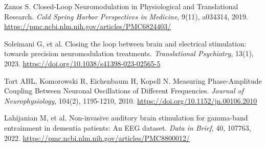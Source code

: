 \documentclass[11pt,letterpaper]{article}
\begin{document}
\begin{enumerate}[label={[\arabic*]}, leftmargin=2em, itemsep=2pt, parsep=0pt]
\item Zanos S. Closed-Loop Neuromodulation in Physiological and Translational Research. \textit{Cold Spring Harbor Perspectives in Medicine}, 9(11), a034314, 2019. \url{https://pmc.ncbi.nlm.nih.gov/articles/PMC6824403/}
\item Soleimani G, et al. Closing the loop between brain and electrical stimulation: towards precision neuromodulation treatments. \textit{Translational Psychiatry}, 13(1), 2023. \url{https://doi.org/10.1038/s41398-023-02565-5}
\item Tort ABL, Komorowski R, Eichenbaum H, Kopell N. Measuring Phase-Amplitude Coupling Between Neuronal Oscillations of Different Frequencies. \textit{Journal of Neurophysiology}, 104(2), 1195-1210, 2010. \url{https://doi.org/10.1152/jn.00106.2010}
\item Lahijanian M, et al. Non-invasive auditory brain stimulation for gamma-band entrainment in dementia patients: An EEG dataset. \textit{Data in Brief}, 40, 107763, 2022. \url{https://pmc.ncbi.nlm.nih.gov/articles/PMC8800012/}
\end{enumerate}
\end{document}
